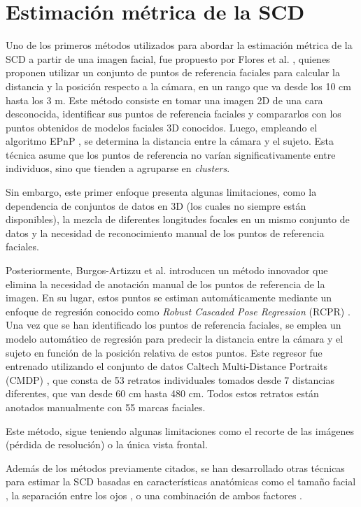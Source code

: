 \section{Estimación métrica de la SCD}

Uno de los primeros métodos utilizados para abordar la estimación métrica de la SCD a partir de una imagen facial, fue propuesto por Flores et al. \cite{28}, quienes proponen utilizar un conjunto de puntos de referencia faciales para calcular la distancia y la posición respecto a la cámara, en un rango que va desde los 10 cm hasta los 3 m.
Este método consiste en tomar una imagen 2D de una cara desconocida, identificar sus puntos de referencia faciales y compararlos con los puntos obtenidos de modelos faciales 3D conocidos. Luego, empleando el algoritmo EPnP \cite{29}, se determina la distancia entre la cámara y el sujeto. Esta técnica asume que los puntos de referencia no varían significativamente entre individuos, sino que tienden a agruparse en \textit{clusters}.

Sin embargo, este primer enfoque presenta algunas limitaciones, como la dependencia de conjuntos de datos en 3D (los cuales no siempre están disponibles), la mezcla de diferentes longitudes focales en un mismo conjunto de datos y la necesidad de reconocimiento manual de los puntos de referencia faciales.

Posteriormente, Burgos-Artizzu et al. \cite{30} introducen un método innovador que elimina la necesidad de anotación manual de los puntos de referencia de la imagen. En su lugar, estos puntos se estiman automáticamente mediante un enfoque de regresión conocido como \textit{Robust Cascaded Pose Regression} (RCPR) \cite{53}. Una vez que se han identificado los puntos de referencia faciales, se emplea un modelo automático de regresión para predecir la distancia entre la cámara y el sujeto en función de la posición relativa de estos puntos. Este regresor fue entrenado utilizando el conjunto de datos Caltech Multi-Distance Portraits (CMDP) \cite{54}, que consta de 53 retratos individuales tomados desde 7 distancias diferentes, que van desde 60 cm hasta 480 cm. Todos estos retratos están anotados manualmente con 55 marcas faciales.

Este método, sigue teniendo algunas limitaciones como el recorte de las imágenes (pérdida de resolución) o la única vista frontal.

Además de los métodos previamente citados, se han desarrollado otras técnicas para estimar la SCD basadas en características anatómicas como el tamaño facial \cite{32}, la separación entre los ojos \cite{33}, o una combinación de ambos factores \cite{34}.

